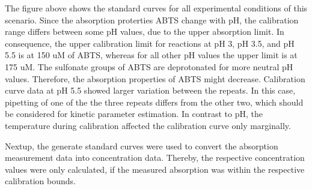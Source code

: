 \documentclass[letterpaper,10pt,english]{jupyterBook}
\begin{document}
\sphinxAtStartPar
The figure above shows the standard curves for all experimental conditions of this scenario. Since the absorption proterties ABTS change with pH, the calibration range differs between some pH values, due to the upper absorption limit. In consequence, the upper calibration limit for reactions at pH 3, pH 3.5, and pH 5.5 is at 150 uM of ABTS, whereas for all other pH values the upper limit is at 175 uM. The sulfonate groups of ABTS are deprotonated for more neutral pH values. Therefore, the absorption properties of ABTS might decrease. Calibration curve data at pH 5.5 showed larger variation between the repeats. In this case, pipetting of one of the the three repeats differs from the other two, which should be considered for kinetic parameter estimation. In contrast to pH, the temperature during calibration affected the calibration curve only marginally.

\sphinxAtStartPar
Nextup, the generate standard curves were used to convert the absorption measurement data into concentration data. Thereby, the respective concentration values were only calculated, if the measured absorption was within the respective calibration bounds.
\end{document}
